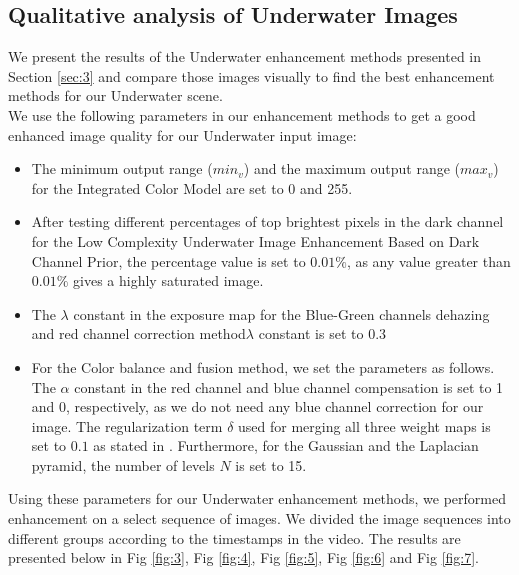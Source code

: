 \documentclass[a4paper,11pt,oneside]{article}
\begin{document}
  \subsection{Qualitative analysis of Underwater Images}
  We present the results of the Underwater enhancement methods presented in Section \ref{sec:3} and compare those images visually to find the best enhancement methods for our Underwater scene.\\
  We use the following parameters in our enhancement methods to get a good enhanced image quality for our Underwater input image:
  \begin{itemize}
  \item The minimum output range ($min_v$) and the maximum output range ($max_v$) for the Integrated Color Model are set to 0 and 255. 
  \item After testing different percentages of top brightest pixels in the dark channel for the Low Complexity Underwater Image Enhancement Based on Dark Channel Prior, the percentage value is set to $0.01\%$, as any value greater than $0.01\%$ gives a highly saturated image.
  \item The $\lambda$ constant in the exposure map for the Blue-Green channels dehazing and red channel correction method$\lambda$ constant is set to 0.3
  \item For the Color balance and fusion method, we set the parameters as follows. The $\alpha$ constant in the red channel and blue channel compensation is set to 1 and 0, respectively, as we do not need any blue channel correction for our image. The regularization term $\delta$ used for merging all three weight maps is set to $0.1$ as stated in \cite{16}. Furthermore, for the Gaussian and the Laplacian pyramid, the number of levels $N$ is set to 15.
  \end{itemize}
  Using these parameters for our Underwater enhancement methods, we performed enhancement on a select sequence of images. We divided the image sequences into different groups according to the timestamps in the video. The results are presented below in Fig \ref{fig:3}, Fig \ref{fig:4}, Fig \ref{fig:5}, Fig \ref{fig:6} and Fig \ref{fig:7}.
\end{document}
